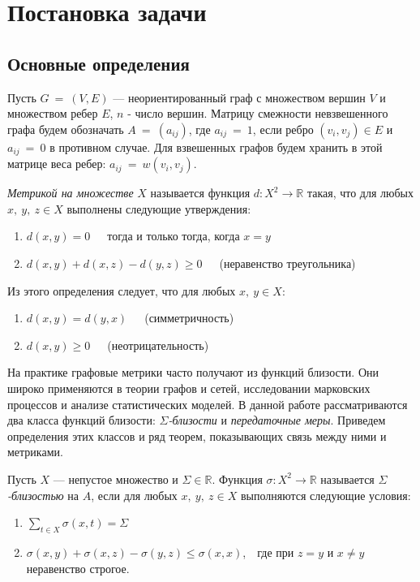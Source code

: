 \chapter{Постановка задачи} \label{chapt1}

\section{Основные определения} \label{sect1_1}

Пусть $G~=~(V, E)$ --- неориентированный граф с множеством вершин $V$ и множеством ребер $E$, $n$ - число вершин. Матрицу смежности невзвешенного графа будем обозначать $A~=~(a_{ij})$, где $a_{ij}~=~1$, если ребро $(v_i, v_j) \in E$ и $a_{ij}~=~0$ в противном случае. Для взвешенных графов будем хранить в этой матрице веса ребер: $a_{ij}~=~w(v_i, v_j)$.

\begin{definition}
\emph{Метрикой на множестве} $X$ называется функция $d: X^2\rightarrow \mathbb{R}$ такая, что для любых $x,\ y,\ z \in X$ выполнены следующие утверждения:
\begin{enumerate}
\item $d(x,y) = 0$\ \ \  тогда и только тогда, когда $x=y$
\item $d(x,y) + d(x,z) - d(y,z) \ge 0$\ \ \  (неравенство треугольника)
\end{enumerate}
\end{definition}

Из этого определения следует, что для любых $x,\ y \in X$:

\begin{enumerate}
\item $d(x,y) = d(y,x)$\ \ \ (симметричность)
\item $d(x,y) \ge 0$\ \ \  (неотрицательность)
\end{enumerate}


На практике графовые метрики часто получают из функций близости. Они широко применяются в теории графов и сетей, исследовании марковских процессов и анализе статистических моделей. В данной работе рассматриваются два класса функций близости: $\Sigma$\emph{-близости} и \emph{передаточные меры}. Приведем определения этих классов и ряд теорем, показывающих связь между ними и метриками.

\begin{definition}
Пусть $X$ --- непустое множество и $\Sigma \in \mathbb{R}$. Функция $\sigma: X^2 \rightarrow \mathbb{R}$ называется $\Sigma$\emph{-близостью} на $A$, если для любых $x,\ y,\ z \in X$ выполняются следующие условия:
\begin{enumerate}
\item $\sum\limits_{t \in X} \sigma (x,t) = \Sigma$
\item $\sigma(x,y) + \sigma(x,z) - \sigma(y,z) \le \sigma(x,x)$,\ \  где при $z = y$ и $x \ne y$ неравенство строгое.
\end{enumerate}
\end{definition}

